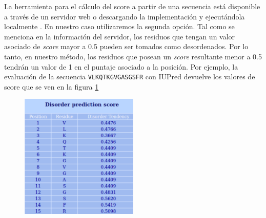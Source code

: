 % 
% 









La herramienta para el cálculo del score a partir de una secuencia está disponible a través de un servidor web \cite{iupredWeb,dosztanyi2005iupred} o descargando la implementación y ejecutándola localmente \cite{iupredDownload}.   
En nuestro caso utilizaremos la segunda opción. 
Tal como se menciona en la información del servidor\cite{dosztanyi2005iupred}, los residuos que tengan un valor asociado de \textit{score} mayor a 0.5 pueden ser tomados como desordenados.
Por lo tanto, en nuestro método, los residuos que posean un \textit{score} resultante menor a 0.5 tendrán un valor de 1 en el puntaje asociado a la posición.
Por ejemplo, la evaluación de la secuencia \texttt{VLKQTKGVGASGSFR} con IUPred devuelve los valores de score que se ven en la figura \ref{iupredResults}

\begin{figure}[h!]
\centering
\includegraphics[width=0.5\textwidth]{img/iupredTabla.png} 
\caption{}
\label{iupredResults}
\end{figure}

